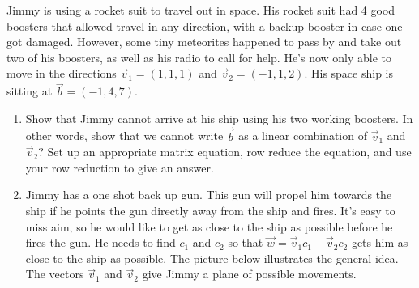 \mysubsection{\ideapro}
\begin{problem}
Jimmy is using a rocket suit to travel out in space. His rocket suit had 4 good boosters that allowed travel in any direction, with a backup booster in case one got damaged.  However, some tiny meteorites happened to pass by and take out two of his boosters, as well as his radio to call for help.  He's now only able to move in the directions $\vec v_1=(1,1,1)$ and $\vec v_2=(-1,1,2)$.  His space ship is sitting at $\vec b=(-1,4,7)$.
\begin{enumerate}
 \item 
 Show that Jimmy cannot arrive at his ship using his two working boosters.  In other words, show that we cannot write $\vec b$ as a linear combination of $\vec v_1$ and $\vec v_2$? Set up an appropriate matrix equation, row reduce the equation, and use your row reduction to give an answer. 
 \item 
 Jimmy has a one shot back up gun.  This gun will propel him towards the ship if he points the gun directly away from the ship and fires.  
 It's easy to miss aim, so he would like to get as close to the ship as possible before he fires the gun. 
 He needs to find $c_1$ and $c_2$ so that $\vec w = \vec v_1 c_1+\vec v_2 c_2$ gets him as close to the ship as possible. The picture below illustrates the general idea. The vectors $\vec v_1$ and $\vec v_2$ give Jimmy a plane of possible movements. 
\begin{center}	
\end{center}
\end{enumerate}
\end{problem}

